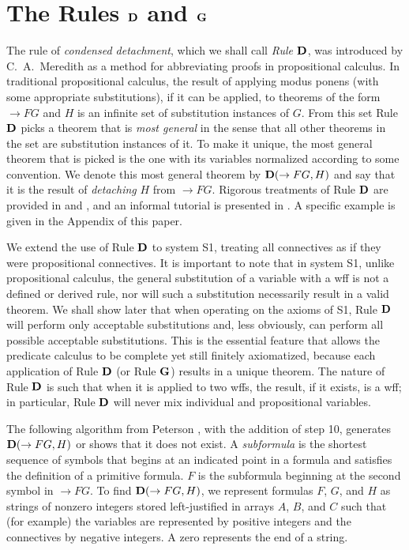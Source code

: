 \documentclass[leqno]{article}
\begin{document}
\section{The Rules ${\bf D}$ and ${\bf G}$}\label{rulesdg}

     The rule of {\em condensed detachment}, which we shall call {\em Rule
${\bf D}$}, was introduced by C.~A.~Meredith \cite{Meredith} as a method for
abbreviating proofs in propositional calculus.  In traditional propositional
calculus, the result of applying modus ponens (with some appropriate
substitutions), if it can be applied, to theorems of the form $\rightarrow FG$
and $H$ is an infinite set of substitution instances of $G$.  From this set
Rule ${\bf D}$ picks a theorem that is {\em most general} in the sense that
all other theorems in the set are substitution instances of it.  To make it
unique, the most general theorem that is picked is the one with its variables
normalized according to some convention.  We denote this most general theorem
by ${\bf D}(\rightarrow FG,H)$ and say that it is the result of {\em
detaching} $H$ from $\rightarrow FG$.  Rigorous treatments of Rule ${\bf D}$
are provided in \cite{Hindley} and \cite{Kalman}, and an informal tutorial is
presented in \cite[pp.\ 2--6]{Zeman}.  A specific example is given in the
Appendix of this paper.

     We extend the use of Rule ${\bf D}$ to system S1, treating all
connectives as if they were propositional connectives.  It is important to
note that in system S1, unlike propositional calculus, the general
substitution of a variable with a wff is not a defined or derived rule, nor
will such a substitution necessarily result in a valid theorem.  We shall show
later that when operating on the axioms of S1, Rule ${\bf D}$ will perform
only acceptable substitutions and, less obviously, can perform all possible
acceptable substitutions.  This is the essential feature that allows the
predicate calculus to be complete yet still finitely axiomatized, because each
application of Rule ${\bf D}$ (or Rule ${\bf G}$) results in a unique theorem.
The nature of Rule ${\bf D}$ is such that when it is applied to two wffs,
the result, if it exists, is a wff; in particular, Rule ${\bf D}$ will never
mix individual and propositional variables.

     The following algorithm from Peterson \cite{Peterson}, with the addition
of step 10, generates ${\bf D}(\rightarrow FG,H)$ or shows that it does not
exist.  A {\em subformula} is the shortest sequence of symbols that begins at
an indicated point in a formula and satisfies the definition of a primitive
formula.  $F$ is the subformula beginning at the second symbol in $\rightarrow
FG$.  To find ${\bf D}(\rightarrow FG,H)$, we represent formulas $F$, $G$, and
$H$ as strings of nonzero integers stored left-justified in arrays $A$, $B$,
and $C$ such that (for example) the variables are represented by positive
integers and the connectives by negative integers.  A zero represents the end
of a string.
\end{document}

